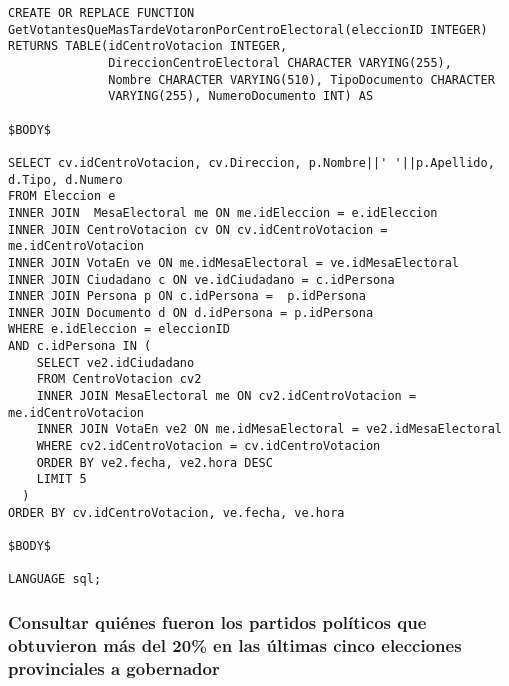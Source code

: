 \begin{verbatim}
CREATE OR REPLACE FUNCTION GetVotantesQueMasTardeVotaronPorCentroElectoral(eleccionID INTEGER)
RETURNS TABLE(idCentroVotacion INTEGER,
              DireccionCentroElectoral CHARACTER VARYING(255),
              Nombre CHARACTER VARYING(510), TipoDocumento CHARACTER
              VARYING(255), NumeroDocumento INT) AS

$BODY$

SELECT cv.idCentroVotacion, cv.Direccion, p.Nombre||' '||p.Apellido, d.Tipo, d.Numero 
FROM Eleccion e
INNER JOIN  MesaElectoral me ON me.idEleccion = e.idEleccion
INNER JOIN CentroVotacion cv ON cv.idCentroVotacion = me.idCentroVotacion
INNER JOIN VotaEn ve ON me.idMesaElectoral = ve.idMesaElectoral
INNER JOIN Ciudadano c ON ve.idCiudadano = c.idPersona
INNER JOIN Persona p ON c.idPersona =  p.idPersona
INNER JOIN Documento d ON d.idPersona = p.idPersona
WHERE e.idEleccion = eleccionID
AND c.idPersona IN (
    SELECT ve2.idCiudadano
    FROM CentroVotacion cv2
    INNER JOIN MesaElectoral me ON cv2.idCentroVotacion = me.idCentroVotacion
    INNER JOIN VotaEn ve2 ON me.idMesaElectoral = ve2.idMesaElectoral
    WHERE cv2.idCentroVotacion = cv.idCentroVotacion
    ORDER BY ve2.fecha, ve2.hora DESC
    LIMIT 5
  )
ORDER BY cv.idCentroVotacion, ve.fecha, ve.hora

$BODY$

LANGUAGE sql;

\end{verbatim}

\subsubsection{Consultar quiénes fueron los partidos políticos que obtuvieron más del 20\% en las últimas cinco elecciones provinciales a gobernador}

